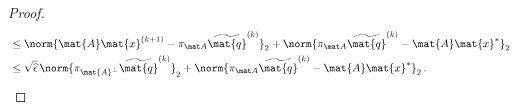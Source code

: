 \begin{proof}
\begin{align}
    &
    \leq \norm{\mat{A}\mat{x}^{(k+1)} - \pi_{\mat A}\widetilde{\mat{q}}^{(k)}}_2 + \norm{\pi_{\mat A}\widetilde{\mat{q}}^{(k)} - \mat{A} \mat{x}^*}_2
    \\ & \leq \label{eq:total-bound-on-a-norm}
    \sqrt{\widehat{\epsilon}}\, \norm{\pi_{\mat{A}^{\perp}}\widetilde{\mat{q}}^{(k)}}_2 + \norm{\pi_{\mat A}\widetilde{\mat{q}}^{(k)} - \mat{A} \mat{x}^*}_2\,.
\end{align}


\end{proof}
